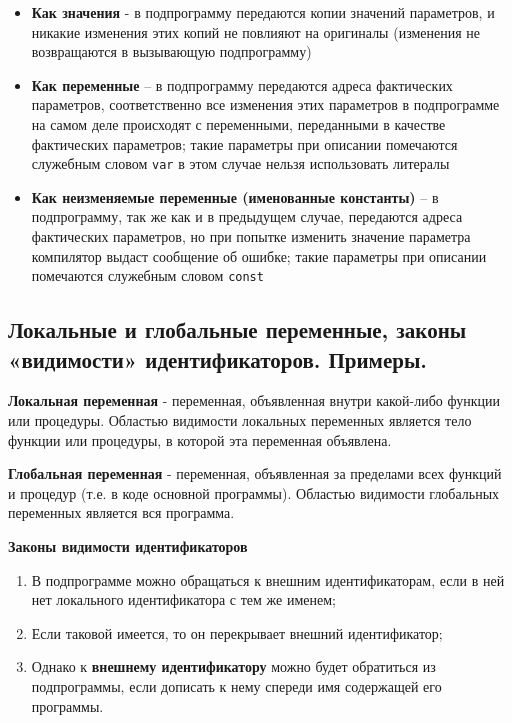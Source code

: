 \begin{enumerate}
\begin{itemize}
                \item	{\bf Как значения} -  в подпрограмму передаются копии значений параметров, и никакие изменения этих копий не повлияют на оригиналы (изменения не возвращаются в вызывающую подпрограмму)
                \item	{\bf Как переменные} – в подпрограмму передаются адреса фактических параметров, соответственно все изменения этих параметров в подпрограмме на самом деле происходят с переменными, переданными в качестве фактических параметров; такие параметры при описании помечаются служебным словом \texttt{var} в этом случае нельзя использовать литералы
                \item	{\bf Как неизменяемые переменные (именованные константы)} – в подпрограмму, так же как и в предыдущем случае, передаются адреса фактических параметров, но при попытке изменить значение параметра компилятор выдаст сообщение об ошибке; такие параметры при описании помечаются служебным словом \texttt{const}

            \end{itemize}

\end{enumerate}


\newpage\subsection{Локальные и глобальные переменные, законы «видимости» идентификаторов. Примеры. }

\begin{myquote}

\end{myquote}

{\bf{Локальная переменная}} - переменная, объявленная внутри какой-либо функции или процедуры. Областью видимости локальных переменных является тело функции или процедуры, в которой эта переменная объявлена.

{\bf{Глобальная переменная}} - переменная, объявленная за пределами всех функций и процедур (т.е. в коде основной программы). Областью видимости глобальных переменных является вся программа.



\noindent
{\bf{Законы видимости идентификаторов}}

\begin{enumerate}
    
\item В подпрограмме можно обращаться к внешним идентификаторам, если в ней нет локального идентификатора с тем же именем;
\item Если таковой имеется, то он перекрывает внешний идентификатор;
\item Однако к {\bf внешнему идентификатору} можно будет обратиться из подпрограммы, если дописать к нему спереди имя содержащей его программы.

\end{enumerate}

